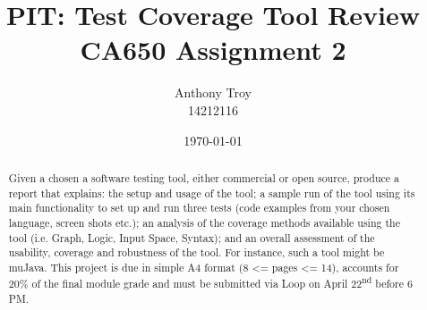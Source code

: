 \documentclass[a4paper]{article}
\title{PIT: Test Coverage Tool Review\\ \Large{CA650 Assignment 2}}
\author{Anthony Troy\\ \small{14212116}}
\date{\today}
\begin{document}
\maketitle

\renewcommand{\abstractname}{Requirements}
\begin{abstract}
Given a chosen a software testing tool, either commercial or open source, produce a report that explains: the setup and usage of the tool; a sample run of the tool using its main functionality to set up and run three tests (code examples from your chosen language, screen shots etc.); an analysis of the coverage methods available using the tool (i.e. Graph, Logic, Input Space, Syntax); and an overall assessment of the usability, coverage and robustness of the tool. For instance, such a tool might be muJava. This project is due in simple A4 format (8 \textless= pages \textless= 14), accounts for  20\% of the final module grade and must be submitted via Loop on April 22\textsuperscript{nd} before 6 \MakeUppercase{pm}.



\end{abstract}

\vspace{3.5cm}
\tableofcontents

\newpage
\end{document}

